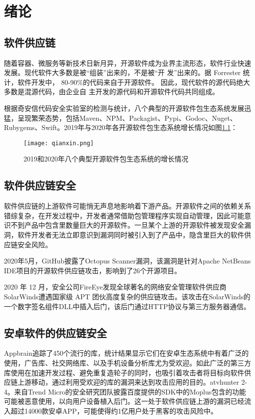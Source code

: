 
\chapter{绪论}



\section{软件供应链}
随着容器、微服务等新技术日新月异，开源软件成为业界主流形态，软件行业快速发展。现代软件大多数是被“组装”出来的，不是被“开
发”出来的。据 Forrester 统计，软件开发中， 80-90\%的代码来自于开源软件。 因此，现代软件的源代码绝大多数是混源代码，由企业自
主开发的源代码和开源软件代码共同组成。

根据奇安信代码安全实验室的检测与统计\cite{qianxin.com}，八个典型的开源软件包生态系统发展迅猛，呈现繁荣态势，包括Maven、NPM、Packagist、Pypi、Godoc、Nuget、Rubygems、Swift。2019年与2020年各开源软件包生态系统增长情况如图\ref{fig:qianxin}：

\begin{figure}[!htp]
  \centering
  \texttt{[image: qianxin.png]} \\
  \caption{2019和2020年八个典型开源软件包生态系统的增长情况}
 \label{fig:qianxin}
\end{figure}

\section{软件供应链安全}
软件供应链的上游软件可能悄无声息地影响着下游产品。开源软件之间的依赖关系错综复杂，在开发过程中，开发者通常借助包管理程序实现自动管理，因此可能意识不到产品中包含里数量巨大的开源软件。一旦某个上游的开源软件被发现安全漏洞，软件开发者无法立即意识到漏洞同时被引入到了产品中，隐含里巨大的软件供应链安全风险。

2020年5月，GitHub披露了Octopus Scanner漏洞\cite{octopus}，该漏洞是针对Apache NetBeans IDE项目的开源软件供应链攻击，影响到了26个开源项目。

2020 年 12 月，安全公司FireEye发现全球著名的网络安全管理软件供应商 SolarWinds遭遇国家级 APT 团伙高度复杂的供应链攻击。该攻击在SolarWinds的一个数字签名组件DLL中插入后门，该后门通过HTTP协议与第三方服务器通信。

\section{安卓软件的供应链安全}
Appbrain\cite{appbrain}追踪了450个流行的库，统计结果显示它们在安卓生态系统中有着广泛的使用，广告库、社交网络库、以及手机设备分析库尤为受欢迎。如此广泛的第三方库使用在加速开发过程、避免重复造轮子的同时，也吸引着攻击者将目标向软件供应链上游移动，通过利用受欢迎的库的漏洞来达到攻击应用的目的。atvhunter 2-4。来自Trend Micro的安全研究团队披露百度提供的SDK中的Moplus包含的功能可能被恶意使用，以向用户设备植入后门\cite{baidu}。这一处于软件供应链上游的漏洞已经流入超过14000款安卓APP，可能使得约1亿用户处于黑客的攻击风险中。

